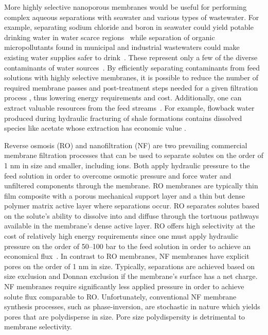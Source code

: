 \documentclass{article}
\begin{document}
  More highly selective nanoporous membranes would be useful for 
  performing complex aqueous separations with seawater and various
  types of wastewater. For example, separating sodium chloride and 
  boron in seawater could yield potable drinking water in water scarce
  regions~\cite{fritzmann_state---art_2007} while separation of organic
  micropollutants found in municipal and industrial wastewaters could 
  make existing water supplies safer to drink~\cite{schwarzenbach_challenge_2006}.
  These represent only a few of the diverse contaminants of water sources~\cite{singh_production_2009,liu_removal_2008}. 
  By efficiently separating contaminants from feed solutions with
  highly selective membranes, it is possible to reduce the number of 
  required membrane passes and post-treatment steps needed for a given 
  filtration process \cite{werber_materials_2016}, thus lowering energy 
  requirements and cost. Additionally, one can extract valuable 
  resources from the feed streams~\cite{sales_resource_2015}. For example,
  flowback water produced during hydraulic fracturing of shale 
  formations contains dissolved species like acetate whose extraction has 
  economic value \cite{dischinger_application_2017,theodori_hydraulic_2014}.

  Reverse osmosis (RO) and nanofiltration (NF) are two prevailing commercial membrane
  filtration processes that can be used to separate solutes on the order of
  1 nm in size and smaller, including ions. Both apply hydraulic pressure 
  to the feed solution in order to overcome osmotic pressure and force water
  and unfiltered components through the membrane. RO membranes are typically
  thin film composite with a porous mechanical support layer and a thin but
  dense polymer matrix active layer where separations occur.\cite{jeong_interfacial_2007}
  RO separates solutes based on the solute's ability to dissolve into and 
  diffuse through the tortuous pathways available in the membrane's dense 
  active layer. RO offers high selectivity at the cost of relatively high 
  energy requirements since one must apply hydraulic pressure on the order of
  50--100 bar to the feed solution in order to achieve an economical flux~\cite{van_der_bruggen_review_2003}.
  In contrast to RO membranes, NF membranes have explicit pores on the order
  of 1 nm in size. Typically, separations are achieved based on size exclusion
  and Donnan exclusion if the membrane's surface has a net charge.~\cite{donnan_theory_1995}
  NF membranes require significantly less applied pressure in order to achieve solute flux
  comparable to RO. Unfortunately, conventional NF membrane synthesis processes, such as 
  phase-inversion\cite{smolders_microstructures_1992}, are stochastic in
  nature which yields pores that are polydisperse in size.\cite{werber_materials_2016}
  Pore size polydispersity is detrimental to membrane selectivity.
  
\end{document}
